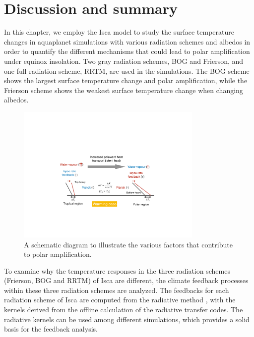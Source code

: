 
\section{Discussion and summary}
\label{sec:polar_amplification_summary}

In this chapter, we employ the Isca model to study the surface temperature changes in aquaplanet simulations with various radiation schemes and albedos in order to quantify the different mechanisms that could lead to polar amplification under equinox insolation. Two gray radiation schemes, BOG and Frierson, and one full radiation scheme, RRTM, are used in the simulations. The BOG scheme shows the largest surface temperature change and polar amplification, while the Frierson scheme shows the weakest surface temperature change when changing albedos. %

\begin{figure}[ht]
    \centering
	\includegraphics[width=0.8\textwidth]{figs/polar_amp/pa_dynamic.pdf}
	\caption{A schematic diagram to illustrate the various factors that contribute to polar amplification.}
	\label{fig:pa_mechanism_schematic}
\end{figure}

To examine why the temperature responses in the three radiation schemes (Frierson, BOG and RRTM) of Isca are different, the climate feedback processes within these three radiation schemes are analyzed. The feedbacks for each radiation scheme of Isca are computed from the radiative method \citep{Soden2008,Shell2008}, with the kernels derived from the offline calculation of the radiative transfer codes. The radiative kernels can be used among different simulations, which provides a solid basis for the feedback analysis.

